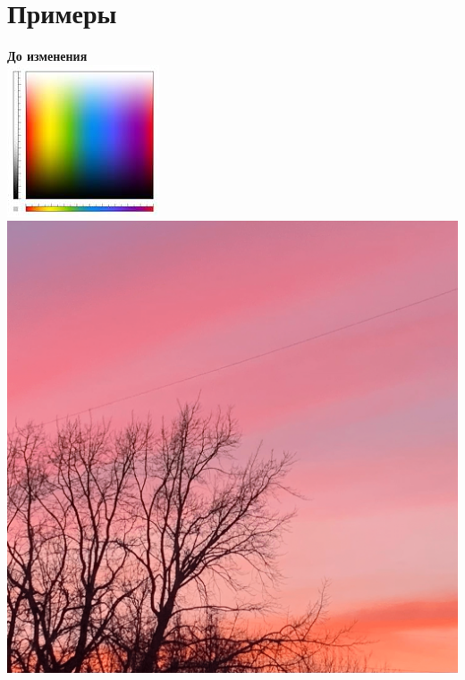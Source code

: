 \documentclass{article}
\begin{document}
\newpage
\section{Примеры}

{\bf До изменения\/} \\
\includegraphics[totalheight = 4cm]{1.png} \hspace{1.5cm}
\includegraphics[totalheight = 4cm]{2.png} \hspace{1.5cm}
\end{document}
